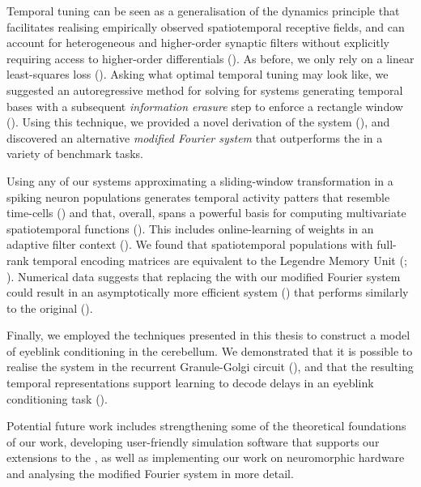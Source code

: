 Temporal tuning can be seen as a generalisation of the \NEF dynamics principle that facilitates realising empirically observed spatiotemporal receptive fields, and can account for heterogeneous and higher-order synaptic filters without explicitly requiring access to higher-order differentials ().
As before, we only rely on a linear least-squares loss ().
Asking what optimal temporal tuning may look like, we suggested an autoregressive method for solving for \LTI systems generating temporal bases with a subsequent \emph{information erasure} step to enforce a rectangle window ().
Using this technique, we provided a novel derivation of the \LDN system (), and discovered an alternative \emph{modified Fourier system} that outperforms the \LDN in a variety of benchmark tasks.

Using any of our \LTI systems approximating a sliding-window transformation in a spiking neuron populations generates temporal activity patters that resemble time-cells () and that, overall, spans a powerful basis for computing multivariate spatiotemporal functions ().
This includes online-learning of weights in an adaptive filter context ().
We found that spatiotemporal \NEF populations with full-rank temporal encoding matrices are equivalent to the Legendre Memory Unit (\LMU; \cite{voelker2019lmu}).
Numerical data suggests that replacing the \LDN with our modified Fourier system could result in an asymptotically more efficient system () that performs similarly to the original \LMU ().

Finally, we employed the techniques presented in this thesis to construct a model of eyeblink conditioning in the cerebellum.
We demonstrated that it is possible to realise the \LDN system in the recurrent Granule-Golgi circuit (), and that the resulting temporal representations support learning to decode delays in an eyeblink conditioning task ().

Potential future work includes strengthening some of the theoretical foundations of our work, developing user-friendly simulation software that supports our extensions to the \NEF, as well as implementing our work on neuromorphic hardware and analysing the modified Fourier system in more detail.

